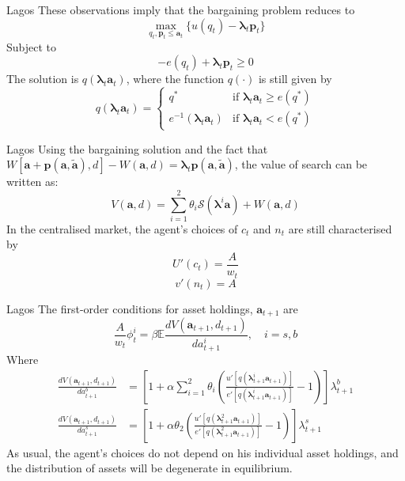\documentclass[aspectratio=169,xcolor=dvipsnames]{beamer}
\begin{document}
\begin{frame}{Lagos}
    These observations imply that the bargaining problem reduces to
    \[
        \max_{q_t, \mathbf{p}_t \le \mathbf{a}_t} \{u(q_t) - \boldsymbol{\lambda}_t \mathbf{p}_t\}
    \]
    Subject to
    \[
        -e(q_t) + \boldsymbol{\lambda}_t \mathbf{p}_t \ge 0
    \]
    The solution is $q(\boldsymbol{\lambda}_t \mathbf{a}_t)$, where the function $q(\cdot)$ is still given by
    \[
        q(\boldsymbol{\lambda}_t \mathbf{a}_t) = \begin{cases} q^* & \text{if } \boldsymbol{\lambda}_t \mathbf{a}_t \ge e(q^*) \\ e^{-1}(\boldsymbol{\lambda}_t \mathbf{a}_t) & \text{if } \boldsymbol{\lambda}_t \mathbf{a}_t < e(q^*) \end{cases}
    \]
\end{frame}

\begin{frame}{Lagos}
    Using the bargaining solution and the fact that $W[\mathbf{a} + \mathbf{p}(\mathbf{a}, \tilde{\mathbf{a}}), d] - W(\mathbf{a}, d) = \boldsymbol{\lambda}_t \mathbf{p}(\mathbf{a}, \tilde{\mathbf{a}})$, the value of search can be written as:
    \[
        V(\mathbf{a}, d) = \sum_{i=1}^2 \theta_i \mathcal{S}(\boldsymbol{\lambda}^i \mathbf{a}) + W(\mathbf{a}, d)
    \]
    In the centralised market, the agent's choices of $c_t$ and $n_t$ are still characterised by
    \[
        U'(c_t) = \frac{A}{w_t}
    \]
    \[
        v'(n_t) = A
    \]
\end{frame}

\begin{frame}{Lagos}
    The first-order conditions for asset holdings, $\mathbf{a}_{t+1}$ are
    \[
        \frac{A}{w_t} \phi^i_t = \beta \mathbb{E} \frac{dV(\mathbf{a}_{t+1}, d_{t+1})}{d a^i_{t+1}}, \quad i = s, b
    \]
    Where
    \begin{align*}
        \frac{dV(\mathbf{a}_{t+1}, d_{t+1})}{d a^b_{t+1}} &= \left[ 1 + \alpha \sum_{i=1}^2 \theta_i \left( \frac{u'[q(\boldsymbol{\lambda}^i_{t+1} \mathbf{a}_{t+1})]}{e'[q(\boldsymbol{\lambda}^i_{t+1} \mathbf{a}_{t+1})]} - 1 \right)\right] \lambda^b_{t+1} \\
        \frac{dV(\mathbf{a}_{t+1}, d_{t+1})}{d a^s_{t+1}} &= \left[ 1 + \alpha \theta_2 \left( \frac{u'[q(\boldsymbol{\lambda}^2_{t+1} \mathbf{a}_{t+1})]}{e'[q(\boldsymbol{\lambda}^2_{t+1} \mathbf{a}_{t+1})]} - 1\right)\right] \lambda^s_{t+1}
    \end{align*}
    As usual, the agent's choices do not depend on his individual asset holdings, and the distribution of assets will be degenerate in equilibrium.
\end{frame}
\end{document}

